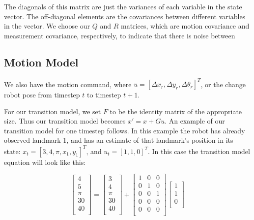 \documentclass[prodmode,acmtecs]{acmsmall} %
\begin{document}
The diagonals of this matrix are just the variances of each variable in the state vector. The off-diagonal elements are the covariances between different variables in the vector. We choose our $Q$ and $R$ matrices, which are motion covariance and measurement covariance, respectively, to indicate that there is noise between 

\subsection{Motion Model}

We also have the motion command, where $u=[\Delta x_r, \Delta y_r, \Delta \theta_r]^T$, or the change robot pose from timestep $t$ to timestep $t+1$.

For our transition model, we set $F$ to be the identity matrix of the appropriate size. Thus our transition model becomes $x' = x + Gu$. An example of our transition model for one timestep follows. In this example the robot has already observed landmark 1, and has an estimate of that landmark's position in its state: $x_t=[3, 4, \pi, x_1, y_1]^T$, and $u_t = [1,1,0]^T$. In this case the transition model equation will look like this:

$$
\begin{bmatrix}
    4  \\
    5  \\
    \pi\\
    30 \\
    40 \\
\end{bmatrix}
=
\begin{bmatrix}
    3  \\
    4  \\
    \pi\\
    30 \\
    40 \\
\end{bmatrix}
+
\begin{bmatrix}
    1 & 0 & 0  \\
    0 & 1 & 0  \\
    0 & 0 & 1  \\
    0 & 0 & 0  \\
    0 & 0 & 0  \\
\end{bmatrix}
\begin{bmatrix}
    1 \\
    1 \\
    0 \\
\end{bmatrix}
$$
\end{document}
